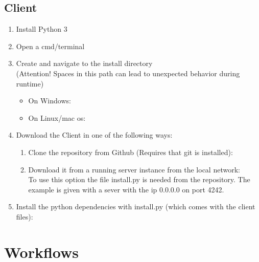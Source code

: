 \documentclass[accentcolor=tud1a, paper=a4, colorback]{tudreport}
\begin{document}
	\section{Client}
	\begin{enumerate}
		\item Install Python 3
		\item Open a cmd/terminal
		\item Create and navigate to the install directory \\{\color{red}(Attention! Spaces in this path can lead to unexpected behavior during runtime)}
		\begin{itemize}
			\item On Windows: \\
			\item On Linux/mac os: \\
		\end{itemize}
		\item Download the Client in one of the following ways:
		\begin{enumerate}
			\item Clone the repository from Github (Requires that git is installed):\\
			\item Download it from a running server instance from the local network:\\ To use this option the file install.py is needed from the repository. The example is given with a sever with the ip 0.0.0.0 on port 4242.\\ 
		\end{enumerate}
		\item Install the python dependencies with install.py (which comes with the client files):\\ 
	\end{enumerate}

	\chapter{Workflows}
\end{document}
